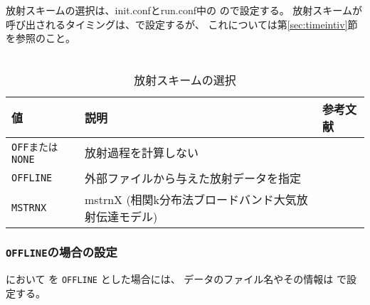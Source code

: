 \section{\SubsecRadiationSetting} \label{sec:basic_usel_radiation} %
放射スキームの選択は、init.confとrun.conf中の
ので設定する。
放射スキームが呼び出されるタイミングは、で設定するが、
これについては第\ref{sec:timeintiv}節を参照のこと。\\

\\

\begin{table}[h]
\begin{center}
  \caption{放射スキームの選択}
  \label{tab:nml_atm_rd}
  \begin{tabularx}{150mm}{lXX} \hline
    \rowcolor[gray]{0.9}  値 & 説明 & 参考文献\\ \hline
      \verb|OFFまたはNONE| & 放射過程を計算しない & \\
      \verb|OFFLINE|      & 外部ファイルから与えた放射データを指定 & \\
      \verb|MSTRNX|       & mstrnX (相関k分布法ブロードバンド大気放射伝達モデル)& \citet{sekiguchi_2008} \\
    \hline
  \end{tabularx}
\end{center}
\end{table}

\subsubsection{\texttt{OFFLINE}の場合の設定}

 において  を \verb|OFFLINE| とした場合には、
データのファイル名やその情報は
 で設定する。\\

